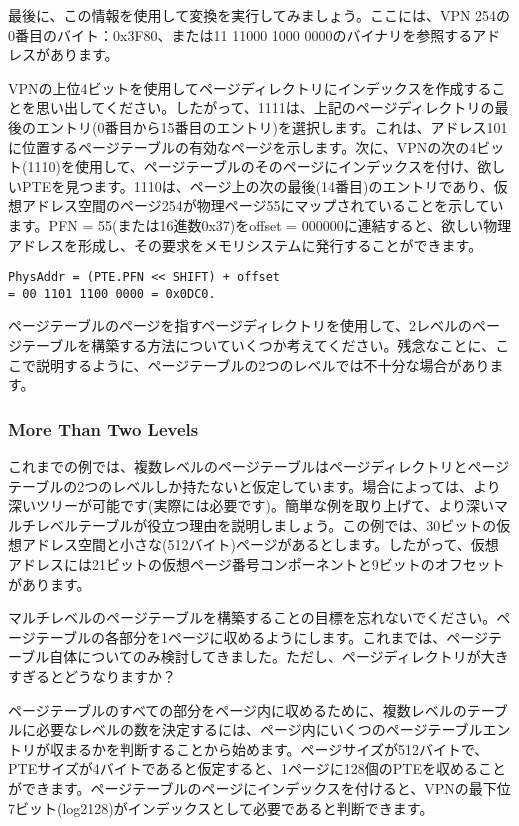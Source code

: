 最後に、この情報を使用して変換を実行してみましょう。ここには、VPN
254の0番目のバイト：0x3F80、または11 11000 1000
0000のバイナリを参照するアドレスがあります。

VPNの上位4ビットを使用してページディレクトリにインデックスを作成することを思い出してください。したがって、1111は、上記のページディレクトリの最後のエントリ(0番目から15番目のエントリ)を選択します。これは、アドレス101に位置するページテーブルの有効なページを示します。次に、VPNの次の4ビット(1110)を使用して、ページテーブルのそのページにインデックスを付け、欲しいPTEを見つます。1110は、ページ上の次の最後(14番目)のエントリであり、仮想アドレス空間のページ254が物理ページ55にマップされていることを示しています。PFN
= 55(または16進数0x37)をoffset =
000000に連結すると、欲しい物理アドレスを形成し、その要求をメモリシステムに発行することができます。

\begin{verbatim}
PhysAddr = (PTE.PFN << SHIFT) + offset
= 00 1101 1100 0000 = 0x0DC0.
\end{verbatim}

ページテーブルのページを指すページディレクトリを使用して、2レベルのページテーブルを構築する方法についていくつか考えてください。残念なことに、ここで説明するように、ページテーブルの2つのレベルでは不十分な場合があります。

\hypertarget{more-than-two-levels}{%
\subsubsection*{More Than Two Levels}\label{more-than-two-levels}}

これまでの例では、複数レベルのページテーブルはページディレクトリとページテーブルの2つのレベルしか持たないと仮定しています。場合によっては、より深いツリーが可能です(実際には必要です)。簡単な例を取り上げて、より深いマルチレベルテーブルが役立つ理由を説明しましょう。この例では、30ビットの仮想アドレス空間と小さな(512バイト)ページがあるとします。したがって、仮想アドレスには21ビットの仮想ページ番号コンポーネントと9ビットのオフセットがあります。

マルチレベルのページテーブルを構築することの目標を忘れないでください。ページテーブルの各部分を1ページに収めるようにします。これまでは、ページテーブル自体についてのみ検討してきました。ただし、ページディレクトリが大きすぎるとどうなりますか？

ページテーブルのすべての部分をページ内に収めるために、複数レベルのテーブルに必要なレベルの数を決定するには、ページ内にいくつのページテーブルエントリが収まるかを判断することから始めます。ページサイズが512バイトで、PTEサイズが4バイトであると仮定すると、1ページに128個のPTEを収めることができます。ページテーブルのページにインデックスを付けると、VPNの最下位7ビット(log2128)がインデックスとして必要であると判断できます。


